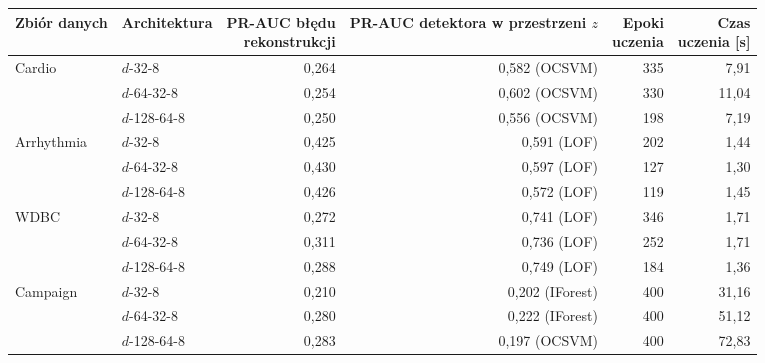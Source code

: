\begin{tabular}{llrrrr}
\toprule
Zbiór danych & Architektura & \makecell[r]{PR-AUC błędu\\rekonstrukcji} & \makecell[r]{PR-AUC detektora\\w przestrzeni $z$} & \makecell[r]{Epoki\\uczenia} & \makecell[r]{Czas\\uczenia [s]} \\
\midrule
Cardio & $d$-32-8 & 0,264 & 0,582 (OCSVM) & 335 & 7,91 \\
 & $d$-64-32-8 & 0,254 & 0,602 (OCSVM) & 330 & 11,04 \\
 & $d$-128-64-8 & 0,250 & 0,556 (OCSVM) & 198 & 7,19 \\
Arrhythmia & $d$-32-8 & 0,425 & 0,591 (LOF) & 202 & 1,44 \\
 & $d$-64-32-8 & 0,430 & 0,597 (LOF) & 127 & 1,30 \\
 & $d$-128-64-8 & 0,426 & 0,572 (LOF) & 119 & 1,45 \\
WDBC & $d$-32-8 & 0,272 & 0,741 (LOF) & 346 & 1,71 \\
 & $d$-64-32-8 & 0,311 & 0,736 (LOF) & 252 & 1,71 \\
 & $d$-128-64-8 & 0,288 & 0,749 (LOF) & 184 & 1,36 \\
Campaign & $d$-32-8 & 0,210 & 0,202 (IForest) & 400 & 31,16 \\
 & $d$-64-32-8 & 0,280 & 0,222 (IForest) & 400 & 51,12 \\
 & $d$-128-64-8 & 0,283 & 0,197 (OCSVM) & 400 & 72,83 \\
\bottomrule
\end{tabular}
